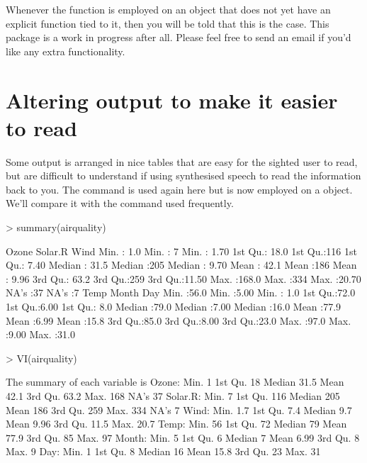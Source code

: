  
Whenever the  function is employed on an object that does not yet have an explicit function tied to it, then you will be told that this is the case. This package is a work in progress after all. Please feel free to send an email if you'd like any extra functionality. 
 
 
 
\section{Altering \R{} output to make it easier to read} 
 
Some \R{} output is arranged in nice tables that are easy for the sighted user to read, but are difficult to understand if using synthesised  speech to read the information back to you. The  command is used again here but is now employed on a  object. We'll compare it with the  command used frequently. 
\begin{Schunk}
\begin{Sinput}
> summary(airquality) 
\end{Sinput}
\begin{Soutput}
     Ozone          Solar.R         Wind      
 Min.   :  1.0   Min.   :  7   Min.   : 1.70  
 1st Qu.: 18.0   1st Qu.:116   1st Qu.: 7.40  
 Median : 31.5   Median :205   Median : 9.70  
 Mean   : 42.1   Mean   :186   Mean   : 9.96  
 3rd Qu.: 63.2   3rd Qu.:259   3rd Qu.:11.50  
 Max.   :168.0   Max.   :334   Max.   :20.70  
 NA's   :37      NA's   :7                    
      Temp          Month           Day      
 Min.   :56.0   Min.   :5.00   Min.   : 1.0  
 1st Qu.:72.0   1st Qu.:6.00   1st Qu.: 8.0  
 Median :79.0   Median :7.00   Median :16.0  
 Mean   :77.9   Mean   :6.99   Mean   :15.8  
 3rd Qu.:85.0   3rd Qu.:8.00   3rd Qu.:23.0  
 Max.   :97.0   Max.   :9.00   Max.   :31.0  
                                             
\end{Soutput}
\begin{Sinput}
> VI(airquality) 
\end{Sinput}
\begin{Soutput}

The summary of each variable is
Ozone: Min. 1   1st Qu. 18   Median 31.5   Mean 42.1   3rd Qu. 63.2   Max. 168   NA's 37  
Solar.R: Min. 7   1st Qu. 116   Median 205   Mean 186   3rd Qu. 259   Max. 334   NA's 7  
Wind: Min. 1.7   1st Qu. 7.4   Median 9.7   Mean 9.96   3rd Qu. 11.5   Max. 20.7  
Temp: Min. 56   1st Qu. 72   Median 79   Mean 77.9   3rd Qu. 85   Max. 97  
Month: Min. 5   1st Qu. 6   Median 7   Mean 6.99   3rd Qu. 8   Max. 9  
Day: Min. 1   1st Qu. 8   Median 16   Mean 15.8   3rd Qu. 23   Max. 31  
\end{Soutput}
\end{Schunk}
 
